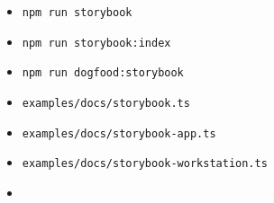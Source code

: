 \begin{itemize}
\tightlist
\item
  \texttt{n\allowbreak{}p\allowbreak{}m\allowbreak{} \allowbreak{}r\allowbreak{}u\allowbreak{}n\allowbreak{} \allowbreak{}s\allowbreak{}t\allowbreak{}o\allowbreak{}r\allowbreak{}y\allowbreak{}b\allowbreak{}o\allowbreak{}o\allowbreak{}k}
\item
  \texttt{n\allowbreak{}p\allowbreak{}m\allowbreak{} \allowbreak{}r\allowbreak{}u\allowbreak{}n\allowbreak{} \allowbreak{}s\allowbreak{}t\allowbreak{}o\allowbreak{}r\allowbreak{}y\allowbreak{}b\allowbreak{}o\allowbreak{}o\allowbreak{}k\allowbreak{}:\allowbreak{}i\allowbreak{}n\allowbreak{}d\allowbreak{}e\allowbreak{}x}
\item
  \texttt{n\allowbreak{}p\allowbreak{}m\allowbreak{} \allowbreak{}r\allowbreak{}u\allowbreak{}n\allowbreak{} \allowbreak{}d\allowbreak{}o\allowbreak{}g\allowbreak{}f\allowbreak{}o\allowbreak{}o\allowbreak{}d\allowbreak{}:\allowbreak{}s\allowbreak{}t\allowbreak{}o\allowbreak{}r\allowbreak{}y\allowbreak{}b\allowbreak{}o\allowbreak{}o\allowbreak{}k}
\item
  \texttt{e\allowbreak{}x\allowbreak{}a\allowbreak{}m\allowbreak{}p\allowbreak{}l\allowbreak{}e\allowbreak{}s\allowbreak{}/\allowbreak{}d\allowbreak{}o\allowbreak{}c\allowbreak{}s\allowbreak{}/\allowbreak{}s\allowbreak{}t\allowbreak{}o\allowbreak{}r\allowbreak{}y\allowbreak{}b\allowbreak{}o\allowbreak{}o\allowbreak{}k\allowbreak{}.\allowbreak{}t\allowbreak{}s}
\item
  \texttt{e\allowbreak{}x\allowbreak{}a\allowbreak{}m\allowbreak{}p\allowbreak{}l\allowbreak{}e\allowbreak{}s\allowbreak{}/\allowbreak{}d\allowbreak{}o\allowbreak{}c\allowbreak{}s\allowbreak{}/\allowbreak{}s\allowbreak{}t\allowbreak{}o\allowbreak{}r\allowbreak{}y\allowbreak{}b\allowbreak{}o\allowbreak{}o\allowbreak{}k\allowbreak{}-\allowbreak{}a\allowbreak{}p\allowbreak{}p\allowbreak{}.\allowbreak{}t\allowbreak{}s}
\item
  \texttt{e\allowbreak{}x\allowbreak{}a\allowbreak{}m\allowbreak{}p\allowbreak{}l\allowbreak{}e\allowbreak{}s\allowbreak{}/\allowbreak{}d\allowbreak{}o\allowbreak{}c\allowbreak{}s\allowbreak{}/\allowbreak{}s\allowbreak{}t\allowbreak{}o\allowbreak{}r\allowbreak{}y\allowbreak{}b\allowbreak{}o\allowbreak{}o\allowbreak{}k\allowbreak{}-\allowbreak{}w\allowbreak{}o\allowbreak{}r\allowbreak{}k\allowbreak{}s\allowbreak{}t\allowbreak{}a\allowbreak{}t\allowbreak{}i\allowbreak{}o\allowbreak{}n\allowbreak{}.\allowbreak{}t\allowbreak{}s}
\item

\end{itemize}
